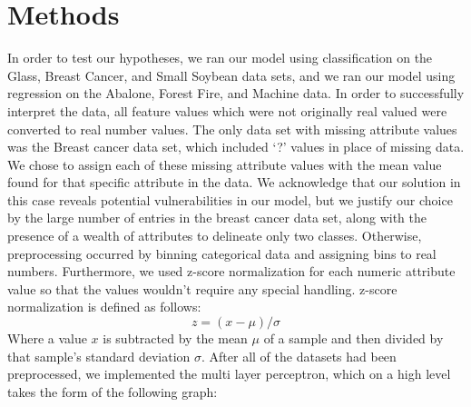 \documentclass[twoside,11pt]{article}
\begin{document}
\section{Methods}
In order to test our hypotheses, we ran our model using classification on the Glass, Breast Cancer, and Small Soybean data sets, and 
we ran our model using regression on the Abalone, Forest Fire, and Machine data. In order to successfully interpret the data, all feature values
which were not originally real valued were converted to real number values. The only data set with missing attribute values was the Breast cancer
data set, which included `?' values in place of missing data. We chose to assign each of these missing attribute values with the mean value found for 
that specific attribute in the data. We acknowledge that our
solution in this case reveals potential vulnerabilities in our model, but we justify our choice by the large number of entries in the breast
cancer data set, along with the presence of a wealth of attributes to delineate only two classes. 
Otherwise, preprocessing occurred by binning categorical data and assigning bins to real numbers. Furthermore, we used z-score normalization 
for each numeric attribute value so that the values wouldn't require any special handling.
z-score normalization is defined as follows:
\begin{equation}
	z = (x-\mu)/\sigma
\end{equation}
Where a value $x$ is subtracted by the mean $\mu$ of a sample and then divided by that sample's standard deviation $\sigma$.
After all of the datasets had been preprocessed, we implemented the multi
layer perceptron, which on a high level takes the form of the following graph:
\end{document}
